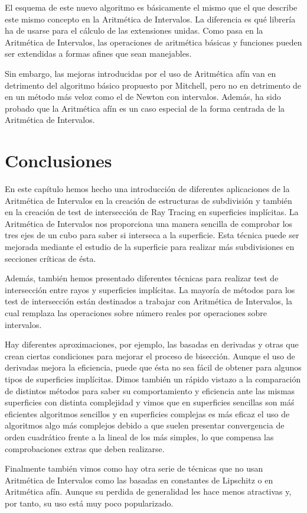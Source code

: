 El esquema de este nuevo algoritmo es básicamente el mismo que el que describe este mismo concepto en la Aritmética de Intervalos. La diferencia es qué librería ha de usarse para el cálculo de las extensiones unidas. Como pasa en la Aritmética de Intervalos, las operaciones de aritmética básicas y funciones pueden ser extendidas a formas afines que sean manejables\cite{Stolfi97}.

Sin embargo, las mejoras introducidas por el uso de Aritmética afín van en detrimento del algoritmo básico propuesto por Mitchell\cite{Cusatis99}, pero no en detrimento de en un método más veloz como el de Newton con intervalos. Además, ha sido probado que la Aritmética afín es un caso especial de la forma centrada de la Aritmética de Intervalos\cite{Gavriliu05}.

\section{Conclusiones}

En este capítulo hemos hecho una introducción de diferentes aplicaciones de la Aritmética de Intervalos en la creación de estructuras de subdivisión y también en la creación de test de intersección de Ray Tracing en superficies implícitas. La Aritmética de Intervalos nos proporciona una manera sencilla de comprobar los tres ejes de un cubo para saber si interseca a la superficie. Esta técnica puede ser mejorada mediante el estudio de la superficie para realizar más subdivisiones en secciones críticas de ésta.

Además, también hemos presentado diferentes técnicas para realizar test de intersección entre rayos y superficies implícitas. La mayoría de métodos para los test de intersección están destinados a trabajar con Aritmética de Intervalos, la cual remplaza las operaciones sobre número reales por operaciones sobre intervalos.

Hay diferentes aproximaciones, por ejemplo, las basadas en derivadas y otras que crean ciertas condiciones para mejorar el proceso de bisección. Aunque  el uso de derivadas mejora la eficiencia, puede que ésta no sea fácil de obtener para algunos tipos de superficies implícitas. Dimos también un rápido vistazo a la comparación de distintos métodos para saber su comportamiento y eficiencia ante las mismas superficies con distinta complejidad y vimos que en superficies sencillas son máś eficientes algoritmos sencillos y en superficies complejas es más eficaz el uso de algoritmos algo más complejos debido a que suelen presentar convergencia de orden cuadrático frente a la lineal de los más simples, lo que compensa las comprobaciones extras que deben realizarse.

Finalmente también vimos como hay otra serie de técnicas que no usan Aritmética de Intervalos como las basadas en constantes de Lipschitz o en Aritmética afín. Aunque su perdida de generalidad les hace menos atractivas y, por tanto, su uso está muy poco popularizado.